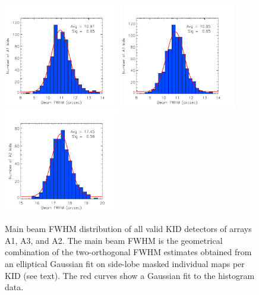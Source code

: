 \begin{figure}[ht!]
  \centering
  \includegraphics[clip=true,width=0.45\textwidth]{../../../Paper_NIKA2_Technical/plot_histo_A1_fwhm_20170424s123.pdf}
  \includegraphics[clip=true,width=0.45\textwidth]{../../../Paper_NIKA2_Technical/plot_histo_A3_fwhm_20170424s123.pdf}
  \includegraphics[clip=true,width=0.45\textwidth]{../../../Paper_NIKA2_Technical/plot_histo_A2_fwhm_20170424s123.pdf}
  
\caption[Main beam FWHM distribution across the array]{Main beam FWHM distribution of all valid KID detectors of arrays A1, A3, and A2. The main beam FWHM is the geometrical combination of the two-orthogonal FWHM estimates obtained from an elliptical Gaussian fit on side-lobe masked individual maps per KID (see text). The red curves show a Gaussian fit to the histogram data.}
  \label{fig:focalplane_histo}
\end{figure}

